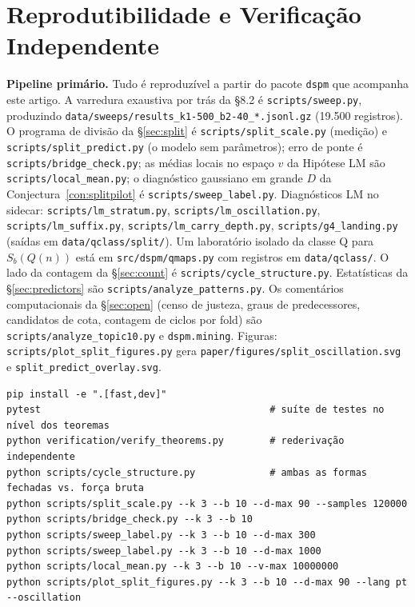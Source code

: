 \documentclass[11pt]{article}
\theoremstyle{definition}
\theoremstyle{remark}
\begin{document}
\appendix

\section{Reprodutibilidade e Verificação Independente}

\textbf{Pipeline primário.} Tudo é reproduzível a partir do pacote \texttt{dspm} que acompanha este artigo. A varredura exaustiva por trás da \S8.2 é \texttt{scripts/sweep.py}, produzindo \texttt{data/sweeps/results\_k1-500\_b2-40\_*.jsonl.gz} (19.500 registros). O programa de divisão da \S\ref{sec:split} é \texttt{scripts/split\_scale.py} (medição) e \texttt{scripts/split\_predict.py} (o modelo sem parâmetros); erro de ponte é \texttt{scripts/bridge\_check.py}; as médias locais no espaço $v$ da Hipótese LM são \texttt{scripts/local\_mean.py}; o diagnóstico gaussiano em grande $D$ da Conjectura~\ref{con:splitpilot} é \texttt{scripts/sweep\_label.py}. Diagnósticos LM no sidecar: \texttt{scripts/lm\_stratum.py}, \texttt{scripts/lm\_oscillation.py}, \texttt{scripts/lm\_suffix.py}, \texttt{scripts/lm\_carry\_depth.py}, \texttt{scripts/g4\_landing.py} (saídas em \texttt{data/qclass/split/}). Um laboratório isolado da classe Q para $S_b(Q(n))$ está em \texttt{src/dspm/qmaps.py} com registros em \texttt{data/qclass/}. O lado da contagem da \S\ref{sec:count} é \texttt{scripts/cycle\_structure.py}. Estatísticas da \S\ref{sec:predictors} são \texttt{scripts/analyze\_patterns.py}. Os comentários computacionais da \S\ref{sec:open} (censo de justeza, graus de predecessores, candidatos de cota, contagem de ciclos por fold) são \texttt{scripts/analyze\_topic10.py} e \texttt{dspm.mining}. Figuras: \texttt{scripts/plot\_split\_figures.py} gera \texttt{paper/figures/split\_oscillation.svg} e \texttt{split\_predict\_overlay.svg}.

\begin{verbatim}
pip install -e ".[fast,dev]"
pytest                                        # suíte de testes no nível dos teoremas
python verification/verify_theorems.py        # rederivação independente
python scripts/cycle_structure.py             # ambas as formas fechadas vs. força bruta
python scripts/split_scale.py --k 3 --b 10 --d-max 90 --samples 120000
python scripts/bridge_check.py --k 3 --b 10
python scripts/sweep_label.py --k 3 --b 10 --d-max 300
python scripts/sweep_label.py --k 3 --b 10 --d-max 1000
python scripts/local_mean.py --k 3 --b 10 --v-max 10000000
python scripts/plot_split_figures.py --k 3 --b 10 --d-max 90 --lang pt --oscillation
\end{verbatim}
\end{document}
